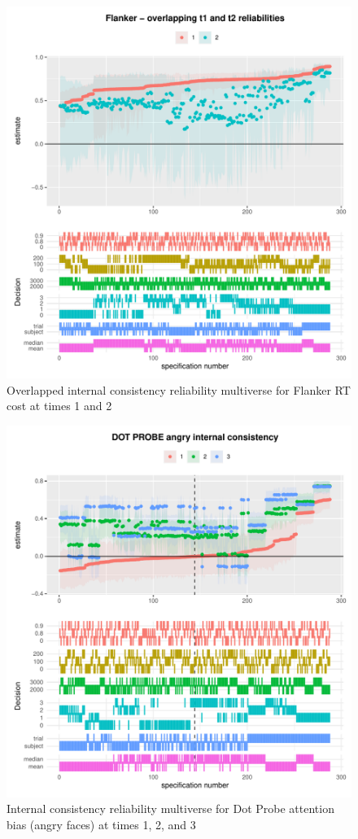\documentclass[
  english,
  man,floatsintext]{apa6}
\begin{document}
\begin{figure}
\centering
\includegraphics{half_trials_files/figure-latex/unnamed-chunk-8-1.pdf}
\caption{\label{fig:unnamed-chunk-8}Overlapped internal consistency reliability multiverse for Flanker RT cost at times 1 and 2}
\end{figure}

\begin{figure}
\centering
\includegraphics{half_trials_files/figure-latex/unnamed-chunk-9-1.pdf}
\caption{\label{fig:unnamed-chunk-9}Internal consistency reliability multiverse for Dot Probe attention bias (angry faces) at times 1, 2, and 3}
\end{figure}
\end{document}
